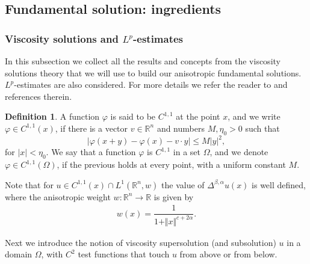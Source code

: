 \documentclass[10pt, leqno]{article}
\theoremstyle{definition}
\newtheorem{definition}[theorem]{Definition}
\theoremstyle{remark}
\numberwithin{equation}{section}
\begin{document}
\subsection{Fundamental solution: ingredients}
\label{sec Fundamental solution: ingredients}
\subsubsection{Viscosity solutions and $L^{p}$-estimates}
In this subsection we collect all the results and concepts from the viscosity solutions theory that we will use to build our anisotropic fundamental solutions. $L^{p}$-estimates are also considered. For more details we refer the reader to \cite{CLU, SL, LEITAO LP, CWW} and references therein.
\begin{definition}
\label{C^{1,1} definition}
A function $\varphi$ is said to be $C^{1,1}$ at the point $x$, and we write $\varphi\in C^{1,1}\left( x \right)$, if there is a vector $v \in \mathbb{R}^{n}$ and numbers $M, \eta_{0} >0$ such that
$$
\vert \varphi \left( x + y\right) - \varphi \left( x \right) -  v \cdot y   \vert \leq M \vert y \vert^{2},
$$
for $\vert  x \vert < \eta_{0}$. We say that a function $\varphi$ is $C^{1,1}$ in a set $\Omega$, and we denote $\varphi \in C^{1,1}\left( \Omega \right)$, if the previous holds at every
point, with a uniform constant $M$.
\end{definition}

Note that for $u \in C^{1,1}\left( x \right) \cap L^{1}\left( \mathbb{R}^{n}, w \right)$ the value of $\Delta^{\beta, \alpha}u(x)$ is well defined, where the anisotropic weight $w: \mathbb{R}^{n} \rightarrow \mathbb{R}$ is given by
\begin{eqnarray}
w(x) = \dfrac{1}{1 + \Vert x \Vert^{c+2\alpha}}.
\end{eqnarray}

Next we introduce the notion of viscosity supersolution (and subsolution) $u$ in a domain $\Omega$, with $C^{2}$ test functions that touch $u$ from above or from below.
\end{document}

